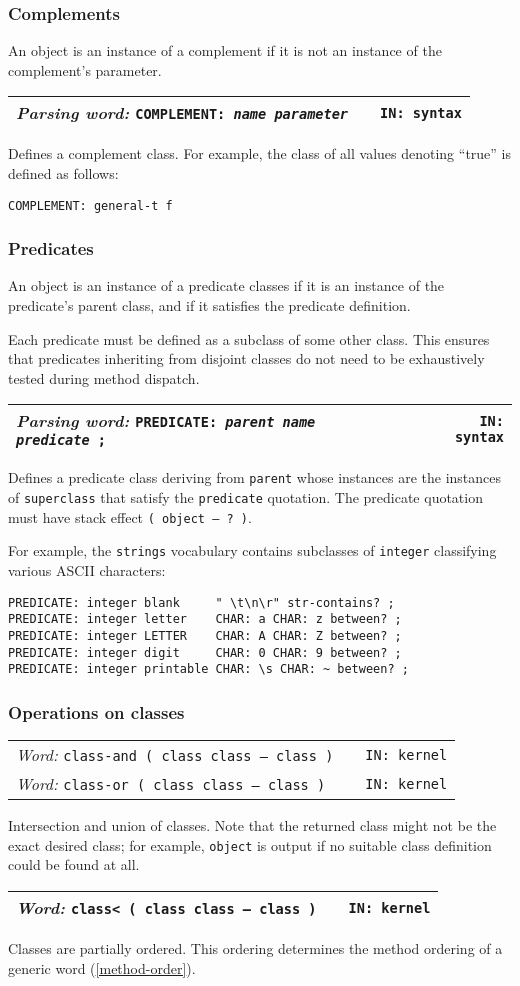 \documentclass{report}
\newcommand{\parsingword}[3]{\index{#1}
\emph{Parsing word:} \texttt{#2} &&\texttt{IN: #3}}
\newcommand{\ordinaryword}[3]{\index{#1}
\emph{Word:} \texttt{#2} &&\texttt{IN: #3}}
\newcommand{\wordtable}[1]{

\begin{tabularx}{12cm}[t]{lXr}
\hline
#1\\
\hline
\end{tabularx}

}
\begin{document}
\subsubsection{Complements}

An object is an instance of a complement if it is not an instance of the complement's parameter.
\wordtable{
\parsingword{COMPLEMENT:}{COMPLEMENT: \emph{name} \emph{parameter}}{syntax}
}
Defines a complement class. For example, the class of all values denoting ``true'' is defined as follows:
\begin{verbatim}
COMPLEMENT: general-t f
\end{verbatim}

\subsubsection{Predicates}
An object is an instance of a predicate classes if it is an instance of the predicate's parent class, and if it satisfies the predicate definition.

Each predicate must be
defined as a subclass of some other class. This ensures that predicates inheriting from disjoint classes do not need to be
exhaustively tested during method dispatch.
\wordtable{
\parsingword{PREDICATE:}{PREDICATE: \emph{parent} \emph{name} \emph{predicate} ;}{syntax}
}
Defines a predicate class deriving from \texttt{parent} whose instances are the instances of \texttt{superclass} that satisfy the \texttt{predicate} quotation. The predicate quotation must have stack effect \texttt{( object -- ?~)}.

For example, the \texttt{strings} vocabulary contains subclasses of \texttt{integer}
classifying various ASCII characters:
\begin{verbatim}
PREDICATE: integer blank     " \t\n\r" str-contains? ;
PREDICATE: integer letter    CHAR: a CHAR: z between? ;
PREDICATE: integer LETTER    CHAR: A CHAR: Z between? ;
PREDICATE: integer digit     CHAR: 0 CHAR: 9 between? ;
PREDICATE: integer printable CHAR: \s CHAR: ~ between? ;
\end{verbatim}

\subsubsection{Operations on classes}
\wordtable{
\ordinaryword{class-and}{class-and ( class class -- class )}{kernel}\\
\ordinaryword{class-or}{class-or ( class class -- class )}{kernel}
}
Intersection and union of classes. Note that the returned class might not be the exact desired class; for example, \texttt{object} is output if no suitable class definition could be found at all.
\wordtable{
\ordinaryword{class<}{class< ( class class -- class )}{kernel}
}
Classes are partially ordered. This ordering determines the method ordering of a generic word (\ref{method-order}).
\end{document}
